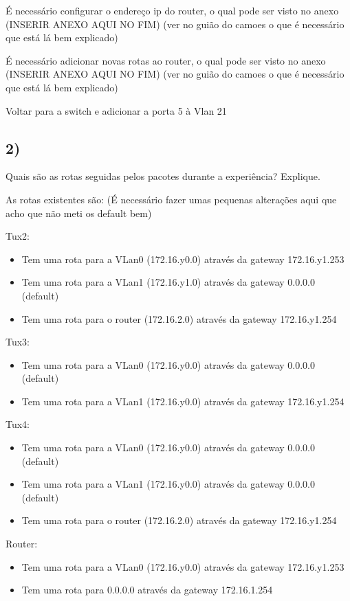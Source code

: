 \documentclass[11pt]{article}
\begin{document}
É necessário configurar o endereço ip do router, o qual pode ser visto no anexo (INSERIR ANEXO AQUI NO FIM) (ver no guião do camoes o que é necessário que está lá bem explicado)

É necessário adicionar novas rotas ao router, o qual pode ser visto no anexo (INSERIR ANEXO AQUI NO FIM) (ver no guião do camoes o que é necessário que está lá bem explicado)

Voltar para a switch e adicionar a porta 5 à Vlan 21


\subsection{2)} Quais são as rotas seguidas pelos pacotes durante a experiência? Explique.

As rotas existentes são:
(É necessário fazer umas pequenas alterações aqui que acho que não meti os default bem)

Tux2:
\begin{itemize}
\item Tem uma rota para a VLan0 (172.16.y0.0) através da gateway 172.16.y1.253
\item Tem uma rota para a VLan1 (172.16.y1.0) através da gateway 0.0.0.0 (default)
\item Tem uma rota para o router (172.16.2.0) através da gateway 172.16.y1.254

\end{itemize}

Tux3:
\begin{itemize}
\item Tem uma rota para a VLan0 (172.16.y0.0) através da gateway 0.0.0.0 (default)
\item Tem uma rota para a VLan1 (172.16.y0.0) através da gateway 172.16.y1.254

\end{itemize}

Tux4:
\begin{itemize}
\item Tem uma rota para a VLan0 (172.16.y0.0) através da gateway 0.0.0.0 (default)
\item Tem uma rota para a VLan1 (172.16.y0.0) através da gateway 0.0.0.0 (default)
\item Tem uma rota para o router (172.16.2.0) através da gateway 172.16.y1.254

\end{itemize}

Router:
\begin{itemize}
\item Tem uma rota para a VLan0 (172.16.y0.0) através da gateway 172.16.y1.253
\item Tem uma rota para 0.0.0.0 através da gateway 172.16.1.254
\end{itemize}
\end{document}

